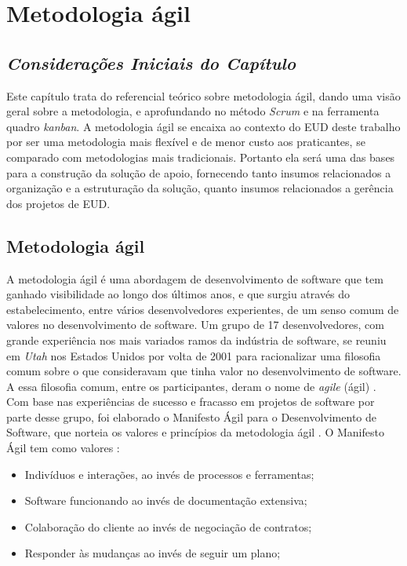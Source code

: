 \chapter[Capítulo 3 - Metodologia ágil]{Metodologia ágil}

\section{\textit{Considerações Iniciais do Capítulo}}

Este capítulo trata do referencial teórico sobre metodologia ágil, dando uma visão geral sobre a metodologia, e aprofundando no método \textit{Scrum} e na ferramenta quadro \textit{kanban}. A metodologia ágil se encaixa ao contexto do EUD deste trabalho por ser uma metodologia mais flexível e de menor custo aos praticantes, se comparado com metodologias mais tradicionais. Portanto ela será uma das bases para a construção da solução de apoio, fornecendo tanto insumos relacionados a organização e a estruturação da solução, quanto insumos relacionados a gerência dos projetos de EUD.

\section{Metodologia ágil}

A metodologia ágil é uma abordagem de desenvolvimento de software que tem ganhado visibilidade ao longo dos últimos anos, e que surgiu através do estabelecimento, entre vários desenvolvedores experientes, de um senso comum de valores no desenvolvimento de software. Um grupo de 17 desenvolvedores, com grande experiência nos mais variados ramos da indústria de software, se reuniu em \textit{Utah} nos Estados Unidos por volta de 2001 para racionalizar uma filosofia comum sobre o que consideravam que tinha valor no desenvolvimento de software. A essa filosofia comum, entre os participantes, deram o nome de \textit{agile} (ágil) \cite{metodoAgil}. Com base nas experiências de sucesso e fracasso em projetos de software por parte desse grupo, foi elaborado o Manifesto Ágil para o Desenvolvimento de Software, que norteia os valores e princípios da metodologia ágil \cite{metodoAgil}. O Manifesto Ágil tem como valores \cite{metodoAgil}:

\begin{itemize}
\item Indivíduos e interações, ao invés de processos e ferramentas;
\item Software funcionando ao invés de documentação extensiva;
\item Colaboração do cliente ao invés de negociação de contratos;
\item Responder às mudanças ao invés de seguir um plano;
\end{itemize}

